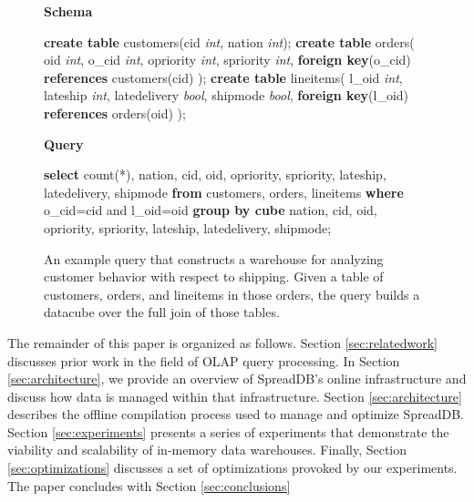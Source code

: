 \documentclass{sig-alternate}
\begin{document}
\begin{figure}
\begin{center}
\textbf{Schema}
\end{center}
\begin{algorithmic}
\STATE \textbf{create table} customers(cid \textit{int}, nation \textit{int}); 
\STATE \textbf{create table} orders(
\STATE \hspace*{0.1in} oid \textit{int}, o\_cid \textit{int}, opriority \textit{int}, spriority \textit{int},
\STATE \hspace*{0.1in}  \textbf{foreign key}(o\_cid) \textbf{references} customers(cid)
\STATE );
\STATE \textbf{create table} lineitems(
\STATE \hspace*{0.1in} l\_oid \textit{int}, lateship \textit{int}, latedelivery \textit{bool}, shipmode \textit{bool},
\STATE \hspace*{0.1in} \textbf{foreign key}(l\_oid) \textbf{references} orders(oid)
\STATE );
\end{algorithmic}
\begin{center}
\textbf{Query}
\end{center}
\begin{algorithmic}
\STATE \textbf{select} count(*),
\STATE \hspace*{0.1in} nation, cid, oid, opriority, spriority, 
\STATE \hspace*{0.1in} lateship, latedelivery, shipmode 
\STATE \textbf{from} customers, orders, lineitems 
\STATE \textbf{where} o\_cid=cid and l\_oid=oid 
\STATE \textbf{group by cube} 
\STATE \hspace*{0.1in} nation, cid, oid, opriority, spriority, 
\STATE \hspace*{0.1in} lateship, latedelivery, shipmode;
\end{algorithmic}
\caption{An example query that constructs a warehouse for analyzing customer behavior with respect to shipping.  Given a table of customers, orders, and lineitems in those orders, the query builds a datacube over the full join of those tables.}
\label{fig:example}  
\end{figure}

The remainder of this paper is organized as follows.  Section \ref{sec:relatedwork} discusses prior work in the field of OLAP query processing.  In Section \ref{sec:architecture}, we provide an overview of SpreadDB's online infrastructure and discuss how data is managed within that infrastructure.  Section \ref{sec:architecture} describes the offline compilation process used to manage and optimize SpreadDB.  Section \ref{sec:experiments} presents a series of experiments that demonstrate the viability and scalability of in-memory data warehouses.  Finally, Section \ref{sec:optimizations} discusses a set of optimizations provoked by our experiments.  The paper concludes with Section \ref{sec:conclusions}
\end{document}
